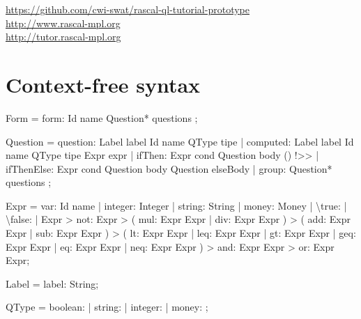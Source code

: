\documentclass[a4paper]{article}
\def\mysect#1{\vspace*{-20pt}\section*{\textsf{#1}}\vspace*{-10pt}}
\begin{document}
\sffamily
\medskip

\noindent\url{https://github.com/cwi-swat/rascal-ql-tutorial-prototype}\\[0pt]
\noindent\url{http://www.rascal-mpl.org}\\[0pt]
\noindent\url{http://tutor.rascal-mpl.org}\\[0pt]
\bigskip

\mysect{Context-free syntax}
\begin{rascal}
  Form  = form:  Id name  Question* questions ;

 Question
  = question: Label label Id name  QType tipe
  | computed: Label label Id name  QType tipe  Expr expr
  | ifThen:   Expr cond  Question body () !\textgreater{}\textgreater{} 
  | ifThenElse:   Expr cond  Question body  Question elseBody
  |  group:  Question* questions ;

 Expr
  = var: Id name
  | integer: Integer
  | string: String
  | money: Money
  | \textbackslash{}true: 
  | \textbackslash{}false: 
  |   Expr 
  \textgreater{} not:  Expr
  \textgreater{}  (
      mul: Expr  Expr
    | div: Expr  Expr
  )
  \textgreater{}  (
      add: Expr  Expr
    | sub: Expr  Expr
  )
  \textgreater{}  (
      lt: Expr  Expr
    | leq: Expr  Expr
    | gt: Expr  Expr
    | geq: Expr  Expr
    | eq: Expr  Expr
    | neq: Expr  Expr
  )
  \textgreater{}  and: Expr  Expr
  \textgreater{}  or: Expr  Expr;
  
 Label =  label: String; 
  
 QType
  = boolean:  
  | string: 
  | integer: 
  | money: ;
\end{rascal}
\end{document}
